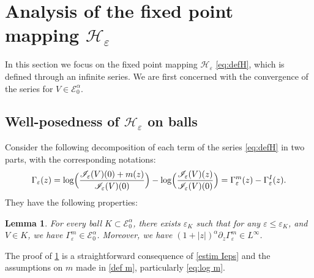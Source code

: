 \documentclass[JEP,XML,SOM,Unicode]{cedram}
\let\mathcal\mathscr
\newcommand{\cI}{\mathcal{I}}
\theoremstyle{plain}
\newtheorem{lem}[thm]{Lemma}
\theoremstyle{definition}
\renewcommand{\H}{\mathcal{H}_\eps}
\let\eps\varepsilon
\newcommand{\Eaz}{\mathcal{E}^\alpha_0}
\newcommand{\Gammam}{\Gamma^m_{\eps}}
\newcommand{\GammaI}{\Gamma^I_{\eps}}
\begin{document}
\section{Analysis of the fixed point mapping \texorpdfstring{$\H$}{He}}\label{sec properties H}
In this section we focus on the fixed point mapping $\H$ \eqref{eq:defH}, which is defined through an infinite series.
We are first concerned with the convergence of the series for $V\in \Eaz$.
\subsection{Well-posedness of $\H$ on balls}\label{sec finiteness H}
Consider the following decomposition of each term of the series \eqref{eq:defH} in two parts, with the corresponding notations:
\begin{equation*}
\Gamma_\eps(z) = \log \Bigl(\dfrac{\cI_\eps(V)(0)+m(z)}{\cI_\eps(V)(0)} \Bigr) - \log \Bigl(\dfrac{\cI_\eps(V)(z)}{\cI_\eps(V)(0)} \Bigr) = \Gammam(z)- \GammaI(z).
\end{equation*}
They have the following properties:

\begin{lem}\label{cond log Ieps+m Eaz}
For every ball $K\subset \Eaz$, there exists $\eps_K$ such that for any $\eps \leq \eps_K$, and $V\in K$, we have $\Gammam \in \Eaz$. Moreover, we have $(1+|z|)^\alpha\partial_z \Gammam \in L^\infty$.
\end{lem}
The proof of \cref{cond log Ieps+m Eaz} is a straightforward consequence of \cref{estim Ieps} and the assumptions on $m$ made in \cref{def m}, particularly \eqref{eq:log m}.
\end{document}
